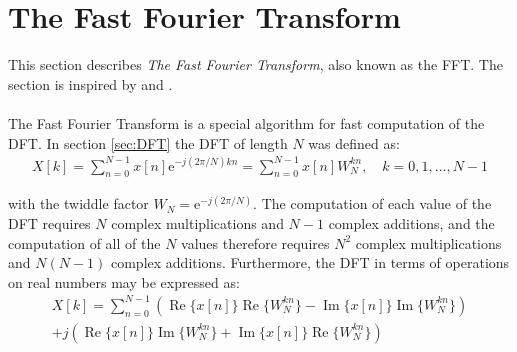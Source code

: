\section{The Fast Fourier Transform} \label{sec:FFT}
This section describes \textit{The Fast Fourier Transform}, also known as the FFT. The section is inspired by \cite{pages 750, 755-763, DTSP} and \cite{page 303, FSP}.
\\ \\
The Fast Fourier Transform is a special algorithm for fast computation of the DFT. In section \ref{sec:DFT} the DFT of length $N$ was defined as:
\begin{align*}
X[k] = \sum_{n=0}^{N-1} x[n] \text{e}^{-j(2\pi/N)kn} = \sum_{n=0}^{N-1} x[n] W_N^{kn}, \quad k = 0, 1, \dots, N-1
\end{align*}

with the twiddle factor $W_N = \text{e}^{-j(2\pi/N)}$. The computation of each value of the DFT requires $N$ complex multiplications and $N-1$ complex additions, and the computation of all of the $N$ values therefore requires $N^2$ complex multiplications and $N(N-1)$ complex additions. Furthermore, the DFT in terms of operations on real numbers may be expressed as:
\begin{align*}
X[k] = \sum_{n=0}^{N-1} \left( \operatorname{Re}\{x[n]\} \operatorname{Re} \{W_N^{kn}\} - \operatorname{Im}\{x[n]\}\operatorname{Im} \{W_N^{kn}\} \right) \\ + j \left( \operatorname{Re} \{x[n]\}\operatorname{Im} \{W_N^{kn}\} + \operatorname{Im} \{x[n]\} \operatorname{Re}\{W_N^{kn}\}\right)
\end{align*}

